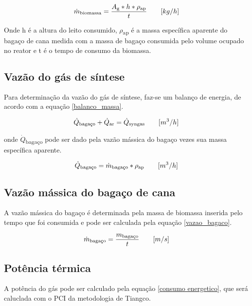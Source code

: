 \begin{equation} \label{vazao_biomassa_PCI}
\dot{m}\textsubscript{biomassa} = \frac{A\textsubscript{g} * h * \rho\textsubscript{ap}}{t} \qquad [kg/h]
\end{equation}

Onde
h é a altura do leito consumido,
$\rho$\textsubscript{ap} é a massa específica aparente do bagaço de cana medida com a massa de bagaço consumida pelo volume ocupado no reator e
t é o tempo de consumo da biomassa.

\subsection{Vazão do gás de síntese}

Para determinação da vazão do gás de síntese, faz-se um balanço de energia, de acordo com a equação \ref{balanco_massa}.

\begin{equation}\label{balanco_massa}
	\dot{Q}\textsubscript{bagaço} + \dot{Q}\textsubscript{ar} = \dot{Q}\textsubscript{syngas}\qquad [m^3/h]
\end{equation}

onde $\dot{Q}$\textsubscript{bagaço} pode ser dado pela vazão mássica do bagaço vezes sua massa específica aparente.

\begin{equation} \label{qdot_bagaco}
	\dot{Q}\textsubscript{bagaço} = \dot{m}\textsubscript{bagaço} * \rho\textsubscript{ap} \qquad [m^3/h]
\end{equation}

\subsection{Vazão mássica do bagaço de cana}

A vazão mássica do bagaço é determinada pela massa de biomassa inserida pelo tempo que foi consumida e pode ser calculada pela equação \ref{vazao_bagaco}.

\begin{equation} \label{vazao_bagaco}
\dot{m}\textsubscript{bagaço} = \frac{m\textsubscript{bagaço}}{t} \qquad [m/s]
\end{equation}

\subsection{Potência térmica}

A potência do gás pode ser calculado pela equação \ref{consumo energetico}, que será caluclada com o PCI da metodologia de Tiangco.

